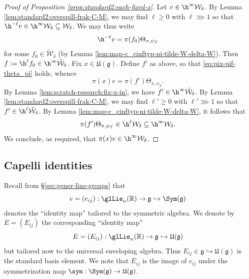 \begin{proof}[Proof of Proposition \ref{prop:standard2:each-fixed-x}]
  Let $v \in \h^\infty \mathcal{W}_\delta$.  By Lemma \ref{lem:standard2:overspill-frak-C-M}, we may find $\ell \geq 0$ with $\ell \ggg 1$ so that $\h^{-\ell} v \in \h^\infty \mathcal{W}_\delta \subseteq \mathcal{W}_\delta$.  We may thus write
  \begin{equation*}
    \h^{-\ell} v = \pi(f_0) \Theta_{\pi,\psi_T}
  \end{equation*}
  for some $f_0 \in \tilde{\mathcal{W}}_\delta$ (by Lemma \ref{lem:map-c_cinftyp-ni-tilde-W-delta-W}).  Then $f := \h^{\ell} f_0 \in \h^\infty \tilde{\mathcal{W}}_{\delta}$.  Fix $x \in \mathfrak{U}(\mathfrak{g})$.  Define $f'$ as above, so that \eqref{eq:pix-pif-theta_pi} holds, whence
  \begin{equation*}
    \pi(x) v = \pi(f') \Theta_{\pi,\psi_T}.
  \end{equation*}
  By Lemma \ref{lem:scratch-research:fix-x-in}, we have $f' \in \h^\infty \tilde{\mathcal{W}}_\delta$.  By Lemma \ref{lem:standard2:overspill-frak-C-M}, we may find $\ell ' \geq 0$ with $\ell ' \ggg 1$ so that $f ' \in \h^{\ell} \tilde{\mathcal{W}}_\delta$.  By Lemma \ref{lem:map-c_cinftyp-ni-tilde-W-delta-W}, it follows that
  \begin{equation*}
    \pi(f') \Theta_{\pi,\psi_T} \in \h^{\ell} \mathcal{W}_\delta \subseteq \h^\infty \mathcal{W}_\delta.
  \end{equation*}
  We conclude, as required, that $\pi(x) v \in \h^\infty \mathcal{W}_\delta$.
\end{proof}



\subsection{Capelli identities}\label{sec:cuhn9jqo9y}
Recall from \S\ref{sec:gener-line-groups} that
\begin{equation*}
  e = (e_{ij }) : \glLie_n(\mathbb{R}) \rightarrow \mathfrak{g} \hookrightarrow \Sym(\mathfrak{g})
\end{equation*}
denotes the ``identity map'' tailored to the symmetric algebra.  We denote by $E = (E_{i j})$ the corresponding ``identity map''
\[
  E = (E_{i j}) : \glLie_n(\mathbb{R}) \rightarrow \mathfrak{g} \hookrightarrow \mathfrak{U}(\mathfrak{g})
\]
but tailored now to the universal enveloping algebra.  Thus $E_{i j} \in \mathfrak{g} \hookrightarrow \mathfrak{U}(\mathfrak{g})$ is the standard basis element.  We note that $E_{i j}$ is the image of $e_{i j}$ under the symmetrization map $\sym : \Sym(\mathfrak{g}) \rightarrow \mathfrak{U}(\mathfrak{g})$.

